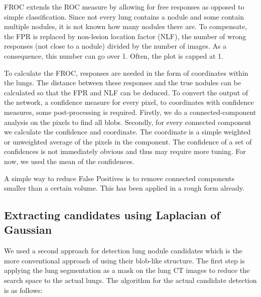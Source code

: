 \documentclass{article}
\begin{document}
FROC extends the ROC measure by allowing for free responses as opposed to simple classification. Since not every lung contains a nodule and some contain multiple nodules, it is not known how many nodules there are. To compensate, the FPR is replaced by non-lesion location factor (NLF), the number of wrong responses (not close to a nodule) divided by the number of images. As a consequence, this number can go over 1. Often, the plot is capped at 1.

To calculate the FROC, responses are needed in the form of coordinates within the lungs. The distance between these responses and the true nodules can be calculated so that the FPR and NLF can be deduced. To convert the output of the network, a confidence measure for every pixel, to coordinates with confidence measures, some post-processing is required. Firstly, we do a connected-component analysis on the pixels to find all blobs. Secondly, for every connected component we calculate the confidence and coordinate. The coordinate is a simple weighted or unweighted average of the pixels in the component. The confidence of a set of confidences is not immediately obvious and thus may require more tuning. For now, we used the mean of the confidences.

A simple way to reduce False Positives is to remove connected components smaller than a certain volume. This has been applied in a rough form already.
\subsection{Extracting candidates using Laplacian of Gaussian}
We used a second approach for detection lung nodule candidates which is the more conventional approach of using their blob-like structure. The first step is applying the lung segmentation as a mask on the lung CT images to reduce the search space to the actual lungs. The algorithm for the actual candidate detection is as follows:
\end{document}
